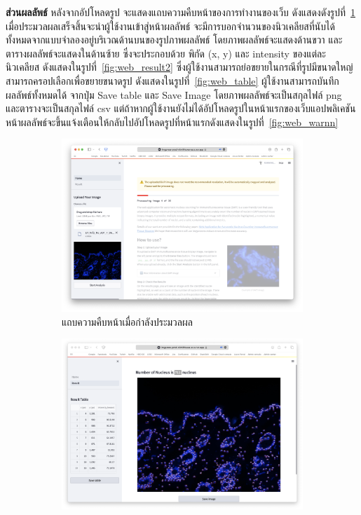 \documentclass[12pt,oneside,openright,a4paper]{cpe-thai-project}
\begin{document}
\textbf{ส่วนผลลัพธ์}
หลังจากอัปโหลดรูป จะแสดงแถบความคืบหน้าของการทำงานของเว็บ ดังแสดงดังรูปที่~\ref{fig:web_result1} เมื่อประมวลผลเสร็จสิ้นจะนำผู้ใช้งานเข้าสู่หน้าผลลัพธ์ จะมีการบอกจำนวนของนิวเคลียสที่นับได้ทั้งหมดจากแบบจำลองอยู่บริเวณด้านบนของรูปภาพผลลัพธ์ โดยภาพผลลัพธ์จะแสดงด้านขวา และ ตารางผลลัพธ์จะแสดงในด้านซ้าย ซึ่งจะประกอบด้วย พิกัด (x, y) และ intensity ของแต่ละนิวเคลียส ดังแสดงในรูปที่~\ref{fig:web_result2} ซึ่งผู้ใช้งานสามารถย่อขยายในกรณีที่รูปมีขนาดใหญ่ สามารถครอปเลือกเพื่อขยายขนาดรูป ดังแสดงในรูปที่~\ref{fig:web_table} ผู้ใช้งานสามารถบันทึกผลลัพธ์ทั้งหมดได้ จากปุ่ม Save table และ Save Image โดยภาพผลลัพธ์จะเป็นสกุลไฟล์ png และตารางจะเป็นสกุลไฟล์ csv แต่ถ้าหากผู้ใช้งานยังไม่ได้อัปโหลดรูปในหน้าแรกของเว็บแอปพลิเคชัน หน้าผลลัพธ์จะขึ้นแจ้งเตือนให้กลับไปอัปโหลดรูปที่หน้าแรกดังแสดงในรูปที่~\ref{fig:web_warnn}
\begin{figure}[!h]
\centering
    \begin{subfigure}[b]{0.42\textwidth}
      \centering
        \includegraphics[width=\textwidth]{images/processing.png}
        \caption{แถบความคืบหน้าเมื่อกำลังประมวลผล}\label{fig:web_result1}
    \end{subfigure}
    \begin{subfigure}[b]{0.42\textwidth}
      \centering
        \includegraphics[width=\textwidth]{images/result.png}

\end{subfigure}
\end{figure}
\end{document}
